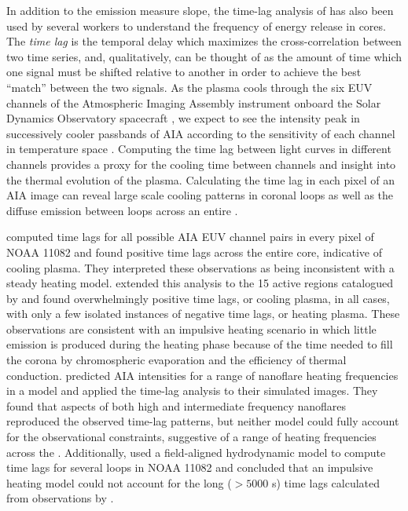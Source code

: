 In addition to the emission measure slope, the time-lag analysis of \citet{viall_evidence_2012} has also been used by several workers to understand the frequency of energy release in \AR{} cores. The \textit{time lag} is the temporal delay which maximizes the cross-correlation between two time series, and, qualitatively, can be thought of as the amount of time which one signal must be shifted relative to another in order to achieve the best ``match'' between the two signals. As the plasma cools through the six EUV channels of the Atmospheric Imaging Assembly instrument \citep[AIA,][]{lemen_atmospheric_2012} onboard the Solar Dynamics Observatory spacecraft \citep[SDO,][]{pesnell_solar_2012}, we expect to see the intensity peak in successively cooler passbands of AIA according to the sensitivity of each channel in temperature space \citep{viall_patterns_2011}. Computing the time lag between light curves in different channels provides a proxy for the cooling time between channels and insight into the thermal evolution of the plasma. Calculating the time lag in each pixel of an AIA image can reveal large scale cooling patterns in coronal loops as well as the diffuse emission between loops across an entire \AR{}.

\citet{viall_evidence_2012} computed time lags for all possible AIA EUV channel pairs in every pixel of \AR{} NOAA 11082 and found positive time lags across the entire \AR{} core, indicative of cooling plasma. They interpreted these observations as being inconsistent with a steady heating model. \citet{viall_survey_2017} extended this analysis to the 15 active regions catalogued by \citet{warren_systematic_2012} and found overwhelmingly positive time lags, or cooling plasma, in all cases, with only a few isolated instances of negative time lags, or heating plasma. These observations are consistent with an impulsive heating scenario in which little emission is produced during the heating phase because of the time needed to fill the corona by chromospheric evaporation and the efficiency of thermal conduction. \citet{bradshaw_patterns_2016} predicted AIA intensities for a range of nanoflare heating frequencies in a model \AR{} and applied the time-lag analysis to their simulated images. They found that aspects of both high and intermediate frequency nanoflares reproduced the observed time-lag patterns, but neither model could fully account for the observational constraints, suggestive of a range of heating frequencies across the \AR{}. Additionally, \citet{lionello_can_2016} used a field-aligned hydrodynamic model to compute time lags for several loops in NOAA 11082 and concluded that an impulsive heating model could not account for the long ($>5000$ s) time lags calculated from observations by \citet{viall_evidence_2012}.

